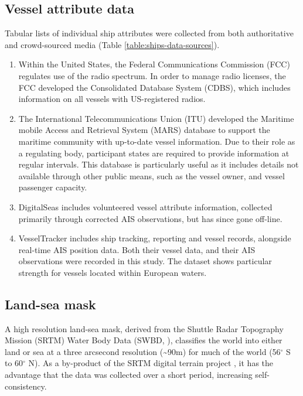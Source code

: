 \subsection{Vessel attribute data}
\label{sec:vessel-attribute-data}
Tabular lists of individual ship attributes were collected from both authoritative and crowd-sourced media (Table \ref{table:ships-data-sources}).
\begin{enumerate}
  \item Within the United States, the Federal Communications Commission (FCC) regulates use of the radio spectrum. In order to manage radio licenses, the FCC developed the Consolidated Database System (CDBS), which includes information on all vessels with US-registered radios. 
  \item The International Telecommunications Union (ITU) developed the Maritime mobile Access and Retrieval System (MARS) database to support the maritime community with up-to-date vessel information. Due to their role as a regulating body, participant states are required to provide information at regular intervals. This database is particularly useful as it includes details not available through other public means, such as the vessel owner, and vessel passenger capacity.
  \item DigitalSeas includes volunteered vessel attribute information, collected primarily through corrected AIS observations, but has since gone off-line.
  \item VesselTracker includes ship tracking, reporting and vessel records, alongside real-time AIS position data. Both their vessel data, and their AIS observations were recorded in this study. The dataset shows particular strength for vessels located within European waters. %
\end{enumerate}

\subsection{Land-sea mask}
\label{sec:land-sea-mask}
  A high resolution land-sea mask, derived from the Shuttle Radar Topography Mission (SRTM) Water Body Data (SWBD, \citealp{slater2006srtm}), classifies the world into either land or sea at a three arcsecond resolution (\textasciitilde{}90m) for much of the world (56$^\circ$ S to 60$^\circ$ N). As a by-product of the SRTM digital terrain project \citep{rabus2003shuttle}, it has the advantage that the data was collected over a short period, increasing self-consistency.

